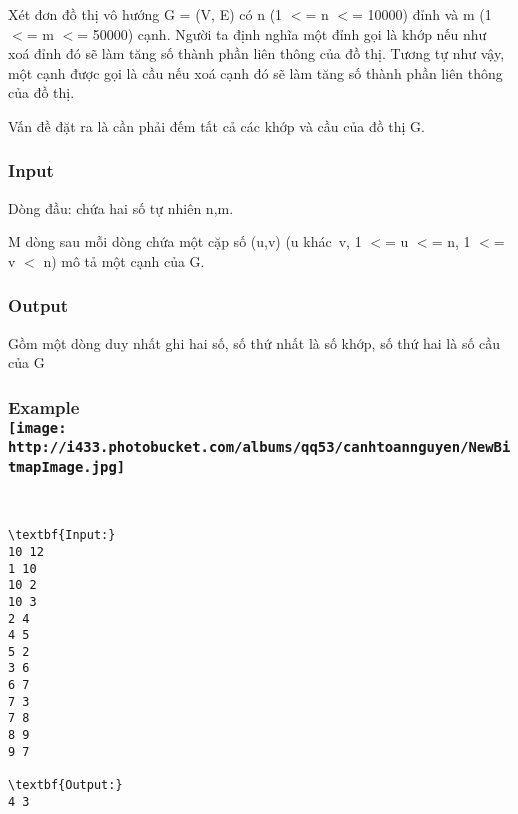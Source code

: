 

Xét đơn đồ thị vô hướng G = (V, E) có n (1 $<$= n $<$= 10000) đỉnh và m (1 $<$= m $<$= 50000) cạnh. Người ta định nghĩa một đỉnh gọi là khớp nếu như xoá đỉnh đó sẽ làm tăng số thành phần liên thông của đồ thị. Tương tự như vậy, một cạnh được gọi là cầu nếu xoá cạnh đó sẽ làm tăng số thành phần liên thông của đồ thị.

Vấn đề đặt ra là cần phải đếm tất cả các khớp và cầu của đồ thị G.

\subsubsection{Input}

Dòng đầu: chứa hai số tự nhiên n,m.

M dòng sau mỗi dòng chứa một cặp số (u,v) (u khác v, 1 $<$= u $<$= n, 1 $<$= v $<$ n) mô tả một cạnh của G.

\subsubsection{Output}

Gồm một dòng duy nhất ghi hai số, số thứ nhất là số khớp, số thứ hai là số cầu của G

\subsubsection{Example
\\
\texttt{[image: http://i433.photobucket.com/albums/qq53/canhtoannguyen/NewBitmapImage.jpg]}}

 
\begin{verbatim}
\textbf{Input:}
10 12
1 10
10 2
10 3
2 4
4 5
5 2
3 6
6 7
7 3
7 8
8 9
9 7

\textbf{Output:}
4 3\end{verbatim}

 

 

 

 